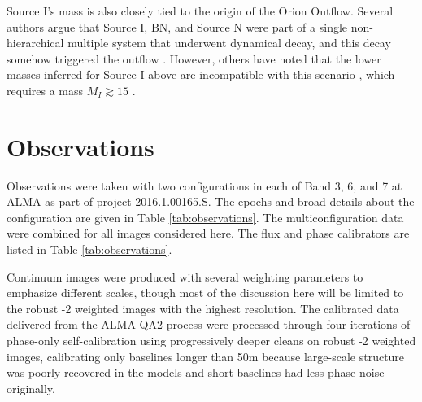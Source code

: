\documentclass[twocolumn]{aastex61}
\begin{document}
Source I's mass is also closely tied to the origin of the Orion Outflow.
Several authors argue that Source I, BN, and Source N \citep[or, alternatively,
source X][]{Luhman2017a} were part of a single non-hierarchical multiple system
that underwent dynamical decay, and this decay somehow triggered the outflow
\citep{Bally2005a,Rodriguez2005a,Goddi2011b,Bally2011a,Bally2015a,Bally2017a}.
However, others have
noted that the lower masses inferred for Source I above are incompatible with
this scenario \citep{Chatterjee2012a,Farias2017a,Plambeck2016a}, which requires
a mass $M_{I} \gtrsim 15$ \msun.

\section{Observations}

Observations were taken with two configurations in each of Band 3, 6, and 7 at
ALMA as part of project 2016.1.00165.S.  The epochs and broad details about the
configuration are given in Table \ref{tab:observations}.  The
multiconfiguration data were combined for all
images considered here.
The flux and phase calibrators are listed in Table \ref{tab:observations}.

Continuum images were produced with several weighting parameters to emphasize
different scales, though most of the discussion here will be limited to the
robust -2 weighted images with the highest resolution.  The calibrated data
delivered from the ALMA QA2 process were processed through four iterations of
phase-only self-calibration using progressively deeper cleans on robust -2
weighted images, calibrating only baselines longer than 50m because large-scale
structure was poorly recovered in the models and short baselines had less
phase noise originally.



\end{document}
